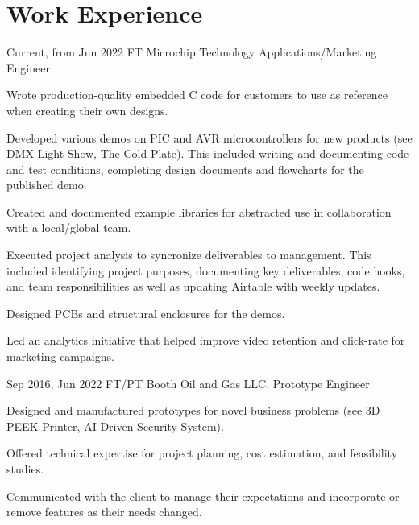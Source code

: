 \documentclass[
	10pt, %
]{FreemanCV}
\begin{document}
\vspace{-35pt}

\section{Work Experience}





\jobentry
	{Current, from Jun 2022} %
	{FT} %
	{Microchip Technology} %
	{Applications/Marketing Engineer} %
	{ %
		\item Wrote production-quality embedded C code for customers to use as reference when creating their own designs.
		\item Developed various demos on PIC and AVR microcontrollers for new products (see DMX Light Show, The Cold Plate). This included writing and documenting code and test conditions, completing design documents and flowcharts for the published demo.
		\item Created and documented example libraries for abstracted use in collaboration with a local/global team.
		\item Executed project analysis to syncronize deliverables to management. This included identifying project purposes, documenting key deliverables, code hooks, and team responsibilities as well as updating Airtable with weekly updates.
		\item Designed PCBs and structural enclosures for the demos.
		\item Led an analytics initiative that helped improve video retention and click-rate for marketing campaigns.
	} 


\jobentry
	{Sep 2016, Jun 2022} %
	{FT/PT} %
	{Booth Oil and Gas LLC.} %
	{Prototype Engineer} %
	{ %
		\item Designed and manufactured prototypes for novel business problems (see 3D PEEK Printer, AI-Driven Security System).
		\item Offered technical expertise for project planning, cost estimation, and feasibility studies.
		\item Communicated with the client to manage their expectations and incorporate or remove features as their needs changed.
	}
	
\end{document}

